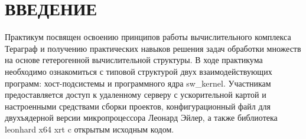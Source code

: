 \section*{ВВЕДЕНИЕ}
Практикум посвящен освоению принципов работы вычислительного комплекса Тераграф и получению практических навыков решения задач обработки множеств на основе гетерогенной вычислительной структуры. В ходе практикума необходимо ознакомиться с типовой структурой двух взаимодействующих программ: хост-подсистемы и программного ядра sw\_kernel. Участникам предоставляется доступ к удаленному серверу с ускорительной картой и настроенными средствами сборки проектов, конфигурационный файл для двухъядерной версии микропроцессора Леонард Эйлер, а также библиотека leonhard x64 xrt c открытым исходным кодом.
